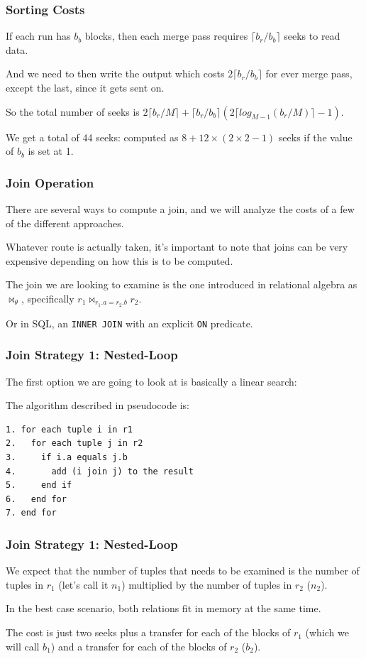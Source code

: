 \begin{frame}
\frametitle{Sorting Costs}

If each run has $b_{b}$ blocks, then each merge pass requires $\lceil b_{r}/b_{b}\rceil$ seeks to read data. 

And we need to then write the output which costs  $2\lceil b_{r}/b_{b}\rceil$ for ever merge pass, except the last, since it gets sent on. 

So the total number of seeks is $2\lceil b_{r}/M\rceil + \lceil b_{r}/b_{b}\rceil(2 \lceil log_{M-1}(b_{r}/M)\rceil - 1)$.


We get a total of 44 seeks: computed as $8 + 12 \times (2 \times 2 - 1)$ seeks if the value of $b_{b}$ is set at 1.

\end{frame}

\begin{frame}
\frametitle{Join Operation}

There are several ways to compute a join, and we will analyze the costs of a few of the different approaches. 

Whatever route is actually taken, it's important to note that joins can be very expensive depending on how this is to be computed. 

The join we are looking to examine is the one introduced in relational algebra as $\Join_{\theta}$, specifically $r_{1} \Join_{r_{1}.a = r_{2}.b} r_{2}$.

Or in SQL, an \texttt{INNER JOIN} with an explicit \texttt{ON} predicate. 

\end{frame}

\begin{frame}[fragile]
\frametitle{Join Strategy 1: Nested-Loop}

The first option we are going to look at is basically a linear search:

The algorithm described in pseudocode is:
\begin{verbatim}
1. for each tuple i in r1
2.   for each tuple j in r2
3.     if i.a equals j.b
4.       add (i join j) to the result
5.     end if
6.   end for
7. end for
\end{verbatim}

\end{frame}

\begin{frame}
\frametitle{Join Strategy 1: Nested-Loop}

We expect that the number of tuples that needs to be examined is the number of tuples in $r_{1}$ (let's call it $n_{1}$) multiplied by the number of tuples in $r_{2}$ ($n_{2}$). 

In the best case scenario, both relations fit in memory at the same time. 

The cost is just two seeks plus a transfer for each of the blocks of $r_{1}$ (which we will call $b_{1}$) and a transfer for each of the blocks of $r_{2}$ ($b_{2}$). 


\end{frame}


